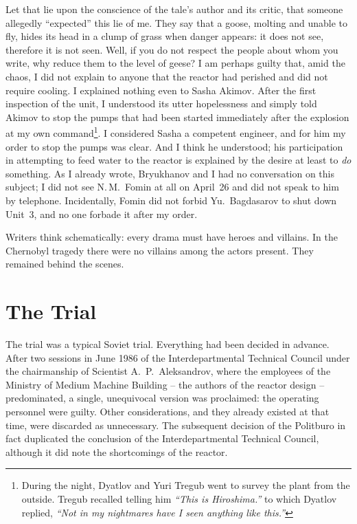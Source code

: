\documentclass[openright]{bookest}
\begin{document}
Let that lie upon the conscience of the tale's author and its critic, that someone allegedly ``expected'' this lie of me. They say that a goose, molting and unable to fly, hides its head in a clump of grass when danger appears: it does not see, therefore it is not seen. Well, if you do not respect the people about whom you write, why reduce them to the level of geese? I am perhaps guilty that, amid the chaos, I did not explain to anyone that the reactor had perished and did not require cooling. I explained nothing even to Sasha Akimov. After the first inspection of the unit, I understood its utter hopelessness and simply told Akimov to stop the pumps that had been started immediately after the explosion at my own command\footnote{During the night, Dyatlov and Yuri Tregub went to survey the plant from the outside. Tregub recalled telling him \textit{``This is Hiroshima.''} to which Dyatlov replied, \textit{``Not in my nightmares have I seen anything like this.''}}. I considered Sasha a competent engineer, and for him my order to stop the pumps was clear. And I think he understood; his participation in attempting to feed water to the reactor is explained by the desire at least to \textit{do} something. As I already wrote, Bryukhanov and I had no conversation on this subject; I did not see N.\,M.~Fomin at all on April~26 and did not speak to him by telephone. Incidentally, Fomin did not forbid Yu.~Bagdasarov to shut down Unit~3, and no one forbade it after my order.

Writers think schematically: every drama must have heroes and villains. In the Chernobyl tragedy there were no villains among the actors present. They remained behind the scenes.

\chapter{The Trial}

The trial was a typical Soviet trial. Everything had been decided in advance. After two sessions in June 1986 of the Interdepartmental Technical Council under the chairmanship of Scientist A.~P.~Aleksandrov, where the employees of the Ministry of Medium Machine Building -- the authors of the reactor design -- predominated, a single, unequivocal version was proclaimed: the operating personnel were guilty. Other considerations, and they already existed at that time, were discarded as unnecessary. The subsequent decision of the Politburo in fact duplicated the conclusion of the Interdepartmental Technical Council, although it did note the shortcomings of the reactor.
\end{document}
